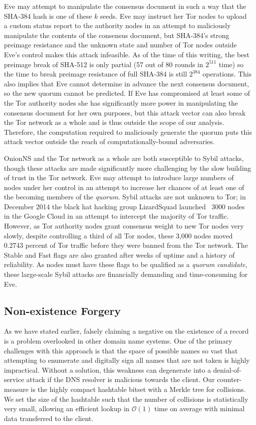 Eve may attempt to manipulate the consensus document in such a way that the SHA-384 hash is one of these $ k $ seeds. Eve may instruct her Tor nodes to upload a custom status report to the authority nodes in an attempt to maliciously manipulate the contents of the consensus document, but SHA-384's strong preimage resistance and the unknown state and number of Tor nodes outside Eve's control makes this attack infeasible. As of the time of this writing, the best preimage break of SHA-512 is only partial (57 out of 80 rounds in $ 2^{511} $ time\cite{li2012converting}) so the time to break preimage resistance of full SHA-384 is still $ 2^{384} $ operations. This also implies that Eve cannot determine in advance the next consensus document, so the new quorum cannot be predicted. If Eve has compromised at least some of the Tor authority nodes she has significantly more power in manipulating the consensus document for her own purposes, but this attack vector can also break the Tor network as a whole and is thus outside the scope of our analysis. Therefore, the computation required to maliciously generate the quorum puts this attack vector outside the reach of computationally-bound adversaries.

OnionNS and the Tor network as a whole are both susceptible to Sybil attacks, though these attacks are made significantly more challenging by the slow building of trust in the Tor network. Eve may attempt to introduce large numbers of nodes under her control in an attempt to increase her chances of at least one of the becoming members of the \emph{quorum}. Sybil attacks are not unknown to Tor; in December 2014 the black hat hacking group LizardSquad launched ~3000 nodes in the Google Cloud in an attempt to intercept the majority of Tor traffic. However, as Tor authority nodes grant consensus weight to new Tor nodes very slowly, despite controlling a third of all Tor nodes, these 3,000 nodes moved 0.2743 percent of Tor traffic before they were banned from the Tor network. The Stable and Fast flags are also granted after weeks of uptime and a history of reliability. As nodes must have these flags to be qualified as a \emph{quorum} \emph{candidate}, these large-scale Sybil attacks are financially demanding and time-consuming for Eve.

\subsection{Non-existence Forgery}

As we have stated earlier, falsely claiming a negative on the existence of a record is a problem overlooked in other domain name systems. One of the primary challenges with this approach is that the space of possible names so vast that attempting to enumerate and digitally sign all names that are not taken is highly impractical. Without a solution, this weakness can degenerate into a denial-of-service attack if the DNS resolver is malicious towards the client. Our counter-measure is the highly compact hashtable bitset with a Merkle tree for collisions. We set the size of the hashtable such that the number of collisions is statistically very small, allowing an efficient lookup in $ \mathcal{O}(1) $ time on average with minimal data transferred to the client.

